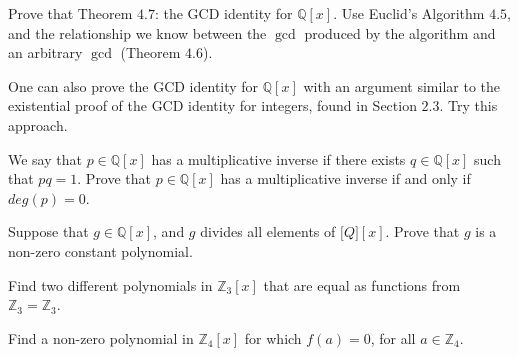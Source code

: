 \documentclass[8pt]{article}
\begin{document}
\begin{tcolorbox}[title=Problem 8, breakable]
    Prove that Theorem $4.7$: the GCD identity for $\mathbb{Q}[x]$.
    Use Euclid's Algorithm $4.5$, and the relationship we know 
    between the $\gcd$ produced by the algorithm and an arbitrary $\gcd$ (Theorem $4.6$).
\end{tcolorbox}

\begin{tcolorbox}[title=Problem 9, breakable]
    One can also prove the GCD identity for $\mathbb{Q}[x]$ with an argument 
    similar to the existential proof of the GCD identity for integers,
    found in Section $2.3$. Try this approach.
\end{tcolorbox}

\begin{tcolorbox}[title=Problem 10, breakable]
    We say that $p \in \mathbb{Q}[x]$ has a multiplicative inverse 
    if there exists $q \in \mathbb{Q}[x]$ such that $pq = 1$.
    Prove that $p \in \mathbb{Q}[x]$ has a multiplicative inverse 
    if and only if $deg(p) = 0$.
\end{tcolorbox}

\begin{tcolorbox}[title=Problem 11, breakable]
    Suppose that $g \in \mathbb{Q}[x]$, and $g$ divides all elements 
    of $\mathbb[Q][x]$. Prove that $g$ is a non-zero constant polynomial.
\end{tcolorbox}

\begin{tcolorbox}[title=Problem 12, breakable]
    Find two different polynomials in $\mathbb{Z}_3[x]$ that are equal 
    as functions from $\mathbb{Z}_3 = \mathbb{Z}_3$.
\end{tcolorbox}

\begin{tcolorbox}[title=Problem 13, breakable]
    Find a non-zero polynomial in $\mathbb{Z}_4[x]$ for which $f(a) = 0$,
    for all $a \in \mathbb{Z}_4$.
\end{tcolorbox}
\end{document}
